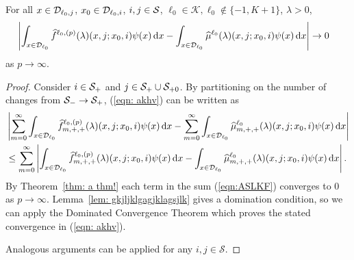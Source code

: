 \begin{lem} \label{lem:vn4}
	For all \(x\in\mathcal{D}_{\ell_0,j}\), \(x_0\in\mathcal{D}_{\ell_0,i}\), \(i,j\in\mathcal{S}\), \(\ell_0\in\mathcal K, \ell_0\notin\{-1,K+1\}\), \(\lambda > 0\),  
	\begin{align}
		&\left|\int_{x\in\mathcal{D}_{\ell_0}}\widehat f^{\ell_0,(p)}(\lambda)(x,j;x_0,i)\psi(x) \, \mathrm{d} x - \int_{x\in\mathcal{D}_{\ell_0}}\widehat \mu^{\ell_0}(\lambda)( x,j; x_0,i)\psi(x) \, \mathrm{d} x\right|\to 0  \label{eqn: akhv}
	\end{align}
	as \(p\to\infty\). 
\end{lem}
\begin{proof}
	 
	
	Consider \(i\in\mathcal{S}_+\) and \(j\in\mathcal{S}_+\cup\mathcal{S}_{+0}\). By partitioning on the number of changes from \(\mathcal{S}_-\to\mathcal{S}_+\), (\ref{eqn: akhv}) can be written as
	\begin{align}
		&\left|\sum_{m=0}^\infty \int_{x\in\mathcal{D}_{\ell_0}}\widehat f^{\ell_0,(p)}_{m,+,+}(\lambda)(x,j;x_0,i)\psi(x)\, \mathrm{d} x
		-
		\sum_{m=0}^\infty \int_{x\in\mathcal{D}_{\ell_0}} \widehat \mu^{\ell_0}_{m,+,+}(\lambda)(x,j;x_0,i)\psi(x)\, \mathrm{d} x\right| \nonumber
		\\&\leq \sum_{m=0}^\infty \left| \int_{x\in\mathcal{D}_{\ell_0}}\widehat f^{\ell_0,(p)}_{m,+,+}(\lambda)(x,j;x_0,i)\psi(x)\, \mathrm{d} x
		-
		\int_{x\in\mathcal{D}_{\ell_0}} \widehat \mu^{\ell_0}_{m,+,+}(\lambda)(x,j;x_0,i)\psi(x)\, \mathrm{d} x\right|. \label{eqn:ASLKF}
        \end{align}
        By Theorem~\ref{thm: a thm!} each term in the sum (\ref{eqn:ASLKF}) converges to \(0\) as \(p\to\infty\). Lemma~\ref{lem: gkjljklgagjklagsjlk} gives a domination condition, so we can apply the Dominated Convergence Theorem which proves the stated convergence in (\ref{eqn: akhv}).
        
        Analogous arguments can be applied for any \(i,j\in\mathcal S\). 
\end{proof}


